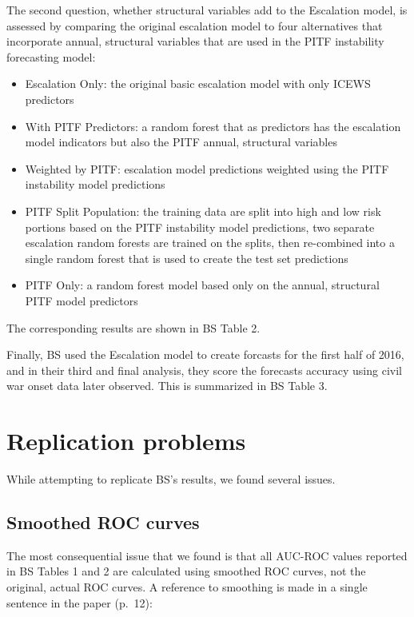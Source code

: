 \documentclass[]{article}
\providecommand{\tightlist}{%
  \setlength{\itemsep}{0pt}\setlength{\parskip}{0pt}}
\begin{document}
The second question, whether structural variables add to the Escalation
model, is assessed by comparing the original escalation model to four
alternatives that incorporate annual, structural variables that are used
in the PITF instability forecasting model:

\begin{itemize}
\tightlist
\item
  Escalation Only: the original basic escalation model with only ICEWS
  predictors
\item
  With PITF Predictors: a random forest that as predictors has the
  escalation model indicators but also the PITF annual, structural
  variables
\item
  Weighted by PITF: escalation model predictions weighted using the PITF
  instability model predictions
\item
  PITF Split Population: the training data are split into high and low
  risk portions based on the PITF instability model predictions, two
  separate escalation random forests are trained on the splits, then
  re-combined into a single random forest that is used to create the
  test set predictions
\item
  PITF Only: a random forest model based only on the annual, structural
  PITF model predictors
\end{itemize}

The corresponding results are shown in BS Table 2.

Finally, BS used the Escalation model to create forcasts for the first
half of 2016, and in their third and final analysis, they score the
forecasts accuracy using civil war onset data later observed. This is
summarized in BS Table 3.

\hypertarget{replication-problems}{%
\section{Replication problems}\label{replication-problems}}

While attempting to replicate BS's results, we found several issues.

\hypertarget{smoothed-roc-curves}{%
\subsection{Smoothed ROC curves}\label{smoothed-roc-curves}}

The most consequential issue that we found is that all AUC-ROC values
reported in BS Tables 1 and 2 are calculated using smoothed ROC curves,
not the original, actual ROC curves. A reference to smoothing is made in
a single sentence in the paper (p.~12):
\end{document}
